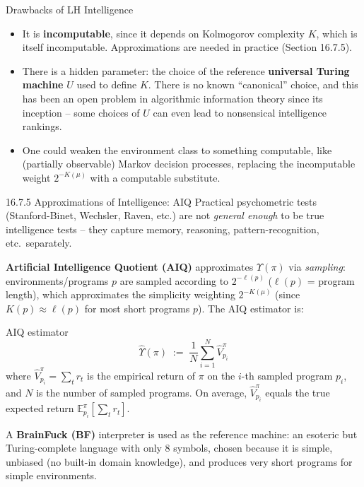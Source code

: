 \documentclass[aspectratio=169,10pt]{beamer}
\newcommand{\E}{\mathbb{E}}
\begin{document}
\begin{frame}{Drawbacks of LH Intelligence}
  \begin{itemize}
    \item It is \textbf{incomputable}, since it depends on Kolmogorov
      complexity $K$, which is itself incomputable. Approximations are
      needed in practice (Section 16.7.5).
    \item There is a hidden parameter: the choice of the reference
      \textbf{universal Turing machine} $U$ used to define $K$. There is
      no known ``canonical'' choice, and this has been an open problem in
      algorithmic information theory since its inception -- some choices
      of $U$ can even lead to nonsensical intelligence rankings.
    \item One could weaken the environment class to something computable,
      like (partially observable) Markov decision processes, replacing the
      incomputable weight $2^{-K(\mu)}$ with a computable substitute.
  \end{itemize}
\end{frame}

\begin{frame}{16.7.5 Approximations of Intelligence: AIQ}
  Practical psychometric tests (Stanford-Binet, Wechsler, Raven, etc.) are
  not \emph{general enough} to be true intelligence tests -- they capture
  memory, reasoning, pattern-recognition, etc.\ separately.

  \vspace{0.3em}
  \textbf{Artificial Intelligence Quotient (AIQ)} approximates
  $\Upsilon(\pi)$ via \emph{sampling}: environments/programs $p$ are sampled
  according to $2^{-\ell(p)}$ ($\ell(p)$ = program length), which
  approximates the simplicity weighting $2^{-K(\mu)}$ (since $K(p) \approx
  \ell(p)$ for most short programs $p$). The AIQ estimator is:
  \begin{block}{AIQ estimator}
    \[
      \hat\Upsilon(\pi) \;:=\; \frac{1}{N}\sum_{i=1}^{N} \hat V^\pi_{p_i}
    \]
    where $\hat V^\pi_{p_i} = \sum_t r_t$ is the empirical return of $\pi$
    on the $i$-th sampled program $p_i$, and $N$ is the number of sampled
    programs. On average, $\hat V^\pi_{p_i}$ equals the true expected
    return $\E^\pi_{p_i}[\sum_t r_t]$.
  \end{block}
  A \textbf{BrainFuck (BF)} interpreter is used as the reference machine: an
  esoteric but Turing-complete language with only 8 symbols, chosen because
  it is simple, unbiased (no built-in domain knowledge), and produces very
  short programs for simple environments.
\end{frame}
\end{document}
